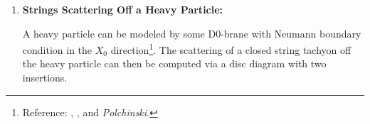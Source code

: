\documentclass[a4paper,10pt]{article}
\begin{document}
\begin{enumerate}
\begin{enumerate}
\begin{gather}
\begin{aligned}
{{					+ k_1^\nu k_2^\mu
				} 
			},
	\end{aligned}
	\end{gather}
	On the other hand, 
	\begin{gather}
		0 = e_{\mu\nu} k_3^\mu k_3^\nu
		= e_{\mu\nu} (k_1+k_2)^\mu (k_1+k_2)^\nu
		= e_{\mu\nu} \pqty\Big{
				k_{12}^\mu k_{12}^\nu
				+ 2\pqty{
					k_1^\mu k_2^\nu
					+ k_1^\nu k_2^\mu
				} 
			}\\
		A(k_1,k_2,e)
		= - \frac{\alpha'^2}{8}
			e_{\mu\nu} k_{12}^\mu k_{12}^\nu
			\pqty{
				1 - \frac{1}{2}
			}
		= -\frac{\alpha'^2}{16}
			e_{\mu\nu}\, k_{12}^\mu k_{12}^\nu
	\end{gather}
	
	\end{enumerate}
	
	\item \textbf{Strings Scattering Off a Heavy Particle:}
	
	A heavy particle can be modeled by some D0-brane with Neumann boundary condition in the $X_0$ direction\footnote{
		Reference: , , and \textit{Polchinski}. 
	}. The scattering of a closed string tachyon off the heavy particle can then be computed via a disc diagram with two insertions. 
	

\end{enumerate}
\end{document}
